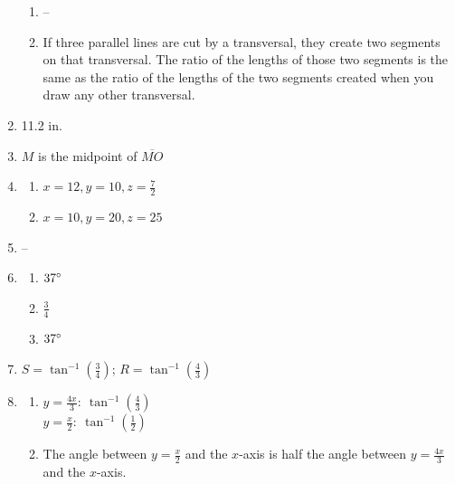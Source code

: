 \documentclass{article}
\begin{document}
\begin{enumerate}
\begin{enumerate}
	\item --
	
	\item If three parallel lines are cut by a transversal, they create two segments on that transversal. The ratio of the lengths of those two segments is the same as the ratio of the lengths of the two segments created when you draw any other transversal.
	
	\end{enumerate}
	
\item 11.2 in.

\item $M$ is the midpoint of $\overline{MO}$

\item

	\begin{enumerate}
	
	\item $x = 12, y = 10, z = \frac{7}{2}$
	
	\item $x = 10, y = 20, z = 25$
	
	\end{enumerate}
	
\item --

\item

	\begin{enumerate}
	
	\item $37 \degree$
	
	\item $\frac{3}{4}$
	
	\item $37 \degree$
	
	\end{enumerate}
	
\item $S = \tan^{-1} \left( \frac{3}{4} \right)$;
	$R = \tan^{-1} \left( \frac{4}{3} \right)$
	
\item

	\begin{enumerate}
	
	\item $y = \frac{4x}{3}: \ \tan^{-1}(\frac{4}{3})$ \\
		$y = \frac{x}{2}: \ \tan^{-1}(\frac{1}{2})$
		
	\item The angle between $y = \frac{x}{2}$ and the $x$-axis is half the angle between $y = \frac{4x}{3}$ and the $x$-axis.
	

\end{enumerate}
\end{enumerate}
\end{document}
